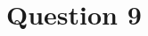\documentclass[../CSC_5RO12_TA_TP3.tex]{subfiles}
\begin{document}
\section{Question 9}
\end{document}
